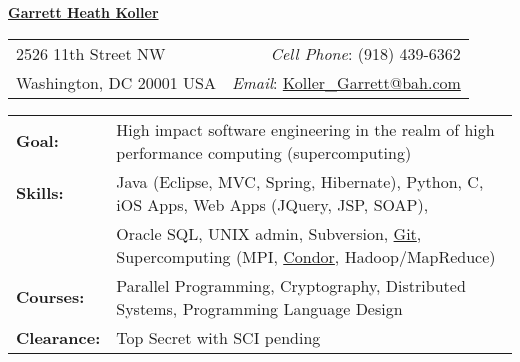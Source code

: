 \documentclass[11pt, letterpaper]{letter}
\newlength{\firstSectionSpacing}	\setlength{\firstSectionSpacing}{6pt}
\newlength{\sectionSpacing}			\setlength{\sectionSpacing}{-1pt}
\begin{document}
\sffamily

\begin{center}
\underline{\Large{\textbf{Garrett Heath Koller}}}
\end{center}
\vspace{-8pt}
\begin{tabular*}{\textwidth}{l@{\extracolsep{\fill}}r}
2526 11th Street NW & \textit{Cell Phone}: (918) 439-6362 \\
Washington, DC  20001 USA & \textit{Email}:
\href{mailto:Koller_Garrett@bah.com}{Koller\_Garrett@bah.com} \\
\hline
\end{tabular*}

\vspace{\firstSectionSpacing}


\begin{tabular*}{\textwidth}{ p{2.2cm} l }
{\large \textbf{Goal:}}		& High impact software engineering in the realm of 
							  high performance computing (supercomputing) \\
{\large \textbf{Skills:}}		& Java (Eclipse, MVC, Spring, Hibernate), Python, C,
							  iOS Apps, Web Apps (JQuery, JSP, SOAP), \\
							& Oracle SQL, UNIX admin, Subversion, 
							  \href{https://github.com/garrettheath4}{Git},
							  Supercomputing (MPI, \href{http://www.htcondorproject.org/}{Condor},
							  Hadoop/MapReduce) \\
{\large \textbf{Courses:}}		& Parallel Programming, Cryptography, 
							  Distributed Systems, Programming Language Design \\
{\large \textbf{Clearance:}}	& Top Secret with SCI pending
\end{tabular*}

\vspace{\firstSectionSpacing}
\vspace{\sectionSpacing}

\end{document}
